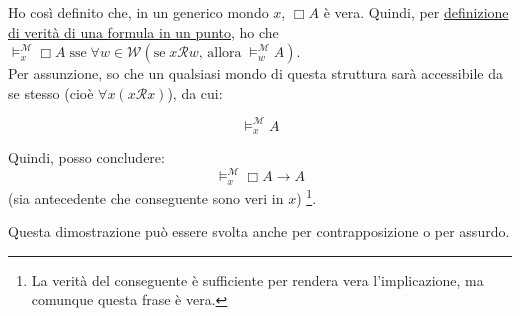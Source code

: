 \documentclass[a4paper,12pt]{article}
\begin{document}
\begin{dimo}
\begin{enumerate}
		      Ho così definito che, in un generico mondo $x$, $\Box A$ è vera. Quindi, per \hyperlink{defverp}{definizione di verità di una formula in un punto}, ho che $\vDash_x^{\mathcal{M}} \Box A \; \text{sse} \; \forall w \in \mathcal{W} (\text{se} \; x\mathcal{R}w  \text{, allora} \; \vDash_w^{\mathcal{M}} A)$. \\
		      Per assunzione, so che un qualsiasi mondo di questa struttura sarà accessibile da se stesso (cioè $\forall x (x\mathcal{R}x)$), da cui:
		      \vspace{0pt}

		      \begin{minipage}{0.48\textwidth}
			      $$\vDash_x^{\mathcal{M}} A$$
		      \end{minipage}
		      \begin{minipage}{0.48\textwidth}
			      \begin{center}
			      \end{center}
		      \end{minipage}
		      \vspace{4pt}

		      Quindi, posso concludere:
		      $$\vDash_x^{\mathcal{M}} \Box A \to A$$
		      (sia antecedente che conseguente sono veri in $x$) \footnote{La verità del conseguente è sufficiente per rendera vera l'implicazione, ma comunque questa frase è vera.}.
	\end{enumerate}
\end{dimo}
Questa dimostrazione può essere svolta anche per contrapposizione o per assurdo. \\
\end{document}
